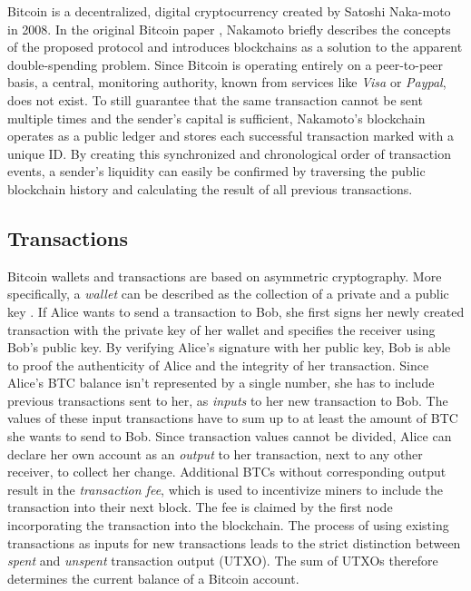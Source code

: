 \documentclass[a4paper,12pt,twoside]{report}
\begin{document}
 Bitcoin is a decentralized, digital cryptocurrency created by Satoshi Naka-moto in 2008. In the original Bitcoin paper \cite{nakamoto2008bitcoin}, Nakamoto briefly describes the concepts of the proposed protocol and introduces blockchains as a solution to the apparent double-spending problem. Since Bitcoin is operating entirely on a peer-to-peer basis, a central, monitoring authority, known from services like \textit{Visa} or \textit{Paypal}, does not exist. To still guarantee that the same transaction cannot be sent multiple times and the sender's capital is sufficient, Nakamoto's blockchain operates as a public ledger and stores each successful transaction marked with a unique ID. By creating this synchronized and chronological order of transaction events, a sender's liquidity can easily be confirmed by traversing the public blockchain history and calculating the result of all previous transactions. \cite{nakamoto2008bitcoin,bitcoinwiki}

\subsection{Transactions}
Bitcoin wallets and transactions are based on asymmetric cryptography. More specifically, a \textit{wallet} can be described as the collection of a private and a public key \cite{okupski2014bitcoin}. If Alice wants to send a transaction to Bob, she first signs her newly created transaction with the private key of her wallet and specifies the receiver using Bob's public key. By verifying Alice's signature with her public key, Bob is able to proof the authenticity of Alice and the integrity of her transaction. Since Alice's BTC balance isn't represented by a single number, she has to include previous transactions sent to her, as \textit{inputs} to her new transaction to Bob. The values of these input transactions have to sum up to at least the amount of BTC she wants to send to Bob. Since transaction values cannot be divided, Alice can declare her own account as an \textit{output} to her transaction, next to any other receiver, to collect her change. Additional BTCs without corresponding output result in the \textit{transaction fee}, which is used to incentivize miners to include the transaction into their next block. The fee is claimed by the first node incorporating the transaction into the blockchain. The process of using existing transactions as inputs for new transactions leads to the strict distinction between \textit{spent} and \textit{unspent} transaction output (UTXO). The sum of UTXOs therefore determines the current balance of a Bitcoin account.
\end{document}
